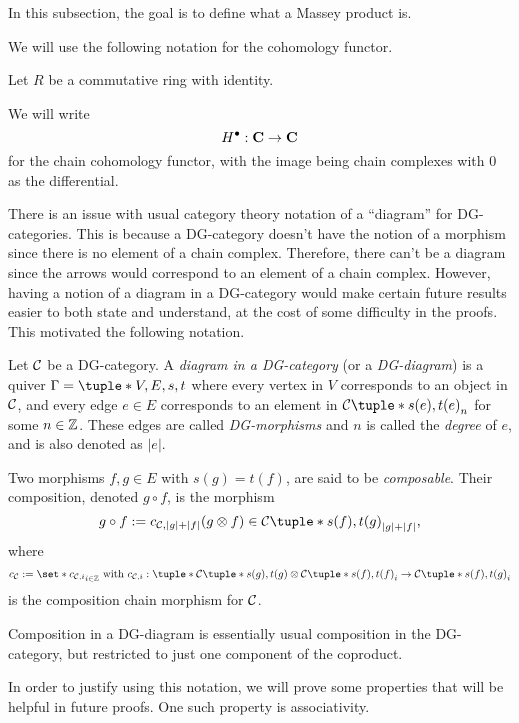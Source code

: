 In this subsection, the goal is to define what a Massey product is.

We will use the following notation for the cohomology functor.

\begin{notation}
    Let \( R \) be a commutative ring with identity.

    We will write
    \[
        H^\bullet: \operatorname{\mathbf{C}} \to \operatorname{\mathbf{C}}
    \]
    for the chain cohomology functor, with the image being chain complexes with \( 0 \) as the differential.
\end{notation}

There is an issue with usual category theory notation of a ``diagram'' for DG-categories. This is because a DG-category doesn't have the notion of a morphism since there is no element of a chain complex. Therefore, there can't be a diagram since the arrows would correspond to an element of a chain complex. However, having a notion of a diagram in a DG-category would make certain future results easier to both state and understand, at the cost of some difficulty in the proofs. This motivated the following notation.

\begin{notation}
    Let \( {\mathcal{C}} \) be a DG-category. A \emph{diagram in a DG-category} (or a \emph{DG-diagram}) is a quiver \( \Gamma = \tuple*{V, E, s, t} \) where every vertex in \( V \) corresponds to an object in \( {\mathcal{C}} \), and every edge \( e \in E \) corresponds to an element in \( \Cc\tuple*{s(e), t(e)}_n \) for some \( n \in {\mathbb{Z}} \). These edges are called \emph{DG-morphisms} and \( n \) is called the \emph{degree} of \( e \), and is also denoted as \( |e| \).

    Two morphisms \( f, g \in E \) with \( s(g) = t(f) \), are said to be \emph{composable}. Their composition, denoted \( g \circ f \), is the morphism
    \[
        g \circ f := c_{\Cc, |g| + |f|}(g \otimes f) \in \Cc\tuple*{s(f), t(g)}_{|g| + |f|},
    \]
    where
    \[
        c_{\Cc} := \set*{c_{\Cc, i}}_{i \in \Zb} \text{ with } c_{\Cc, i}: \tuple*{ \Cc\tuple*{s(g), t(g)} \otimes \Cc\tuple*{s(f), t(f)} }_i \to \Cc\tuple*{s(f), t(g)}_i
    \]
    is the composition chain morphism for \( {\mathcal{C}} \).
\end{notation}

Composition in a DG-diagram is essentially usual composition in the DG-category, but restricted to just one component of the coproduct.

In order to justify using this notation, we will prove some properties that will be helpful in future proofs. One such property is associativity.

